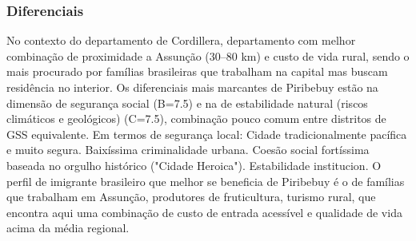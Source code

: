 \subsubsection*{Diferenciais}\label{dif-piribebuy-0314}
No contexto do departamento de Cordillera, departamento com melhor combinação de proximidade a Assunção (30–80 km) e custo de vida rural, sendo o mais procurado por famílias brasileiras que trabalham na capital mas buscam residência no interior. Os diferenciais mais marcantes de Piribebuy estão na dimensão de segurança social (B=7.5) e na de estabilidade natural (riscos climáticos e geológicos) (C=7.5), combinação pouco comum entre distritos de GSS equivalente. Em termos de segurança local: Cidade tradicionalmente pacífica e muito segura. Baixíssima criminalidade urbana. Coesão social fortíssima baseada no orgulho histórico ("Cidade Heroica"). Estabilidade institucion. O perfil de imigrante brasileiro que melhor se beneficia de Piribebuy é o de famílias que trabalham em Assunção, produtores de fruticultura, turismo rural, que encontra aqui uma combinação de custo de entrada acessível e qualidade de vida acima da média regional.
